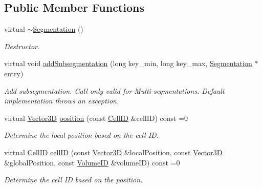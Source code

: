 \subsection*{Public Member Functions}
\begin{DoxyCompactItemize}
\item 
virtual \hyperlink{class_d_d4hep_1_1_d_d_segmentation_1_1_segmentation_a2865f0e68cb2ecfb5717584e67be4228}{$\sim$Segmentation} ()
\begin{DoxyCompactList}\small\item\em Destructor. \item\end{DoxyCompactList}\item 
virtual void \hyperlink{class_d_d4hep_1_1_d_d_segmentation_1_1_segmentation_a881469fb51d55c2119e0a94672cb62da}{addSubsegmentation} (long key\_\-min, long key\_\-max, \hyperlink{class_d_d4hep_1_1_d_d_segmentation_1_1_segmentation}{Segmentation} $\ast$entry)
\begin{DoxyCompactList}\small\item\em Add subsegmentation. Call only valid for Multi-\/segmentations. Default implementation throws an exception. \item\end{DoxyCompactList}\item 
virtual \hyperlink{struct_d_d4hep_1_1_d_d_segmentation_1_1_vector3_d}{Vector3D} \hyperlink{class_d_d4hep_1_1_d_d_segmentation_1_1_segmentation_a594fe6d78667415855858d083b64acad}{position} (const \hyperlink{namespace_d_d4hep_1_1_d_d_segmentation_ac7af071d85cb48820914434a07e21ba1}{CellID} \&cellID) const =0
\begin{DoxyCompactList}\small\item\em Determine the local position based on the cell ID. \item\end{DoxyCompactList}\item 
virtual \hyperlink{namespace_d_d4hep_1_1_d_d_segmentation_ac7af071d85cb48820914434a07e21ba1}{CellID} \hyperlink{class_d_d4hep_1_1_d_d_segmentation_1_1_segmentation_ad5a60953d96d409850d8192f64f8ce3c}{cellID} (const \hyperlink{struct_d_d4hep_1_1_d_d_segmentation_1_1_vector3_d}{Vector3D} \&localPosition, const \hyperlink{struct_d_d4hep_1_1_d_d_segmentation_1_1_vector3_d}{Vector3D} \&globalPosition, const \hyperlink{namespace_d_d4hep_1_1_d_d_segmentation_a61a6833a18d1800bdef176595f83e3ba}{VolumeID} \&volumeID) const =0
\begin{DoxyCompactList}\small\item\em Determine the cell ID based on the position. \item\end{DoxyCompactList}\item 

\end{DoxyCompactItemize}
